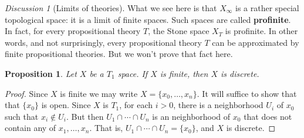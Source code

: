 \documentclass[11pt]{article}
\newtheorem{prop}{Proposition}
\theoremstyle{definition}
\theoremstyle{remark}
\newtheorem*{disc}{Discussion}
\begin{document}
\begin{disc}[Limits of theories]
  What we see here is that $X_\infty$ is a rather special topological
  space: it is a limit of finite spaces.  Such spaces are called
  \textbf{profinite}.  In fact, for every propositional theory $T$,
  the Stone space $X_T$ is profinite.  In other words, and not
  surprisingly, every propositional theory $T$ can be approximated by
  finite propositional theories.  But we won't prove that fact here.
\end{disc}

\begin{prop} Let $X$ be a $T_1$ space.  If $X$ is finite, then $X$ is
  discrete. \label{finite-discrete} \end{prop}

\begin{proof} Since $X$ is finite we may write $X=\{ x_0,\dots
  ,x_n\}$.  It will suffice to show that that $\{ x_0\}$ is open.
  Since $X$ is $T_1$, for each $i>0$, there is a neighborhood $U_i$ of
  $x_0$ such that $x_i\not\in U_i$.  But then $U_1\cap \cdots \cap
  U_n$ is an neighborhood of $x_0$ that does not contain any of
  $x_1,\dots ,x_n$.  That is, $U_1\cap \cdots\cap U_n=\{ x_0\}$, and
  $X$ is discrete.
\end{proof}
\end{document}
